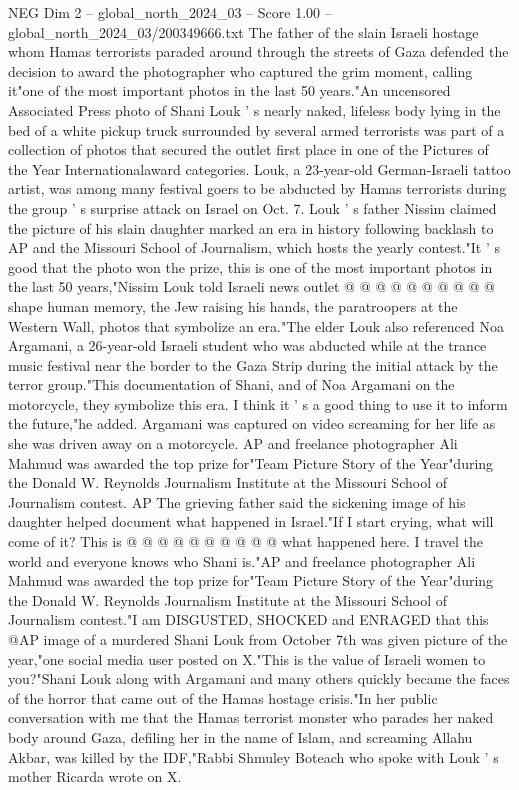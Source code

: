 \begin{textsample}{NEG Dim 2 – global\_north\_2024\_03 – Score 1.00 – global\_north\_2024\_03/200349666.txt}  \label{ex:f2_neg_340}
The father of the slain Israeli hostage whom Hamas terrorists paraded around through the streets of Gaza defended the decision to award the photographer who captured the grim moment, calling it"one of the most important photos in the last 50 years."An uncensored Associated Press photo of Shani Louk ' s nearly naked, lifeless body lying in the bed of a white pickup truck surrounded by several armed terrorists was part of a collection of photos that secured the outlet first place in one of the Pictures of the Year Internationalaward categories.
Louk, a 23-year-old German-Israeli tattoo artist, was among many festival goers to be abducted by Hamas terrorists during the group ' s surprise attack on Israel on Oct. 7.
Louk ' s father Nissim claimed the picture of his slain daughter marked an era in history following backlash to AP and the Missouri School of Journalism, which hosts the yearly contest."It ' s good that the photo won the prize, this is one of the most important photos in the last 50 years,"Nissim Louk told Israeli news outlet @ @ @ @ @ @ @ @ @ @ shape human memory, the Jew raising his hands, the paratroopers at the Western Wall, photos that symbolize an era."The elder Louk also referenced Noa Argamani, a 26-year-old Israeli student who was abducted while at the trance music festival near the border to the Gaza Strip during the initial attack by the terror group."This documentation of Shani, and of Noa Argamani on the motorcycle, they symbolize this era.
I think it ' s a good thing to use it to inform the future,"he added.
Argamani was captured on video screaming for her life as she was driven away on a motorcycle.
AP and freelance photographer Ali Mahmud was awarded the top prize for"Team Picture Story of the Year"during the Donald W.
Reynolds Journalism Institute at the Missouri School of Journalism contest.
AP The grieving father said the sickening image of his daughter helped document what happened in Israel."If I start crying, what will come of it?
This is @ @ @ @ @ @ @ @ @ @ what happened here.
I travel the world and everyone knows who Shani is."AP and freelance photographer Ali Mahmud was awarded the top prize for"Team Picture Story of the Year"during the Donald W.
Reynolds Journalism Institute at the Missouri School of Journalism contest."I am DISGUSTED, SHOCKED and ENRAGED that this @AP image of a murdered Shani Louk from October 7th was given picture of the year,"one social media user posted on X."This is the value of Israeli women to you?"Shani Louk along with Argamani and many others quickly became the faces of the horror that came out of the Hamas hostage crisis."In her public conversation with me that the Hamas terrorist monster who parades her naked body around Gaza, defiling her in the name of Islam, and screaming Allahu Akbar, was killed by the IDF,"Rabbi Shmuley Boteach who spoke with Louk ' s mother Ricarda wrote on X.

\end{textsample}

